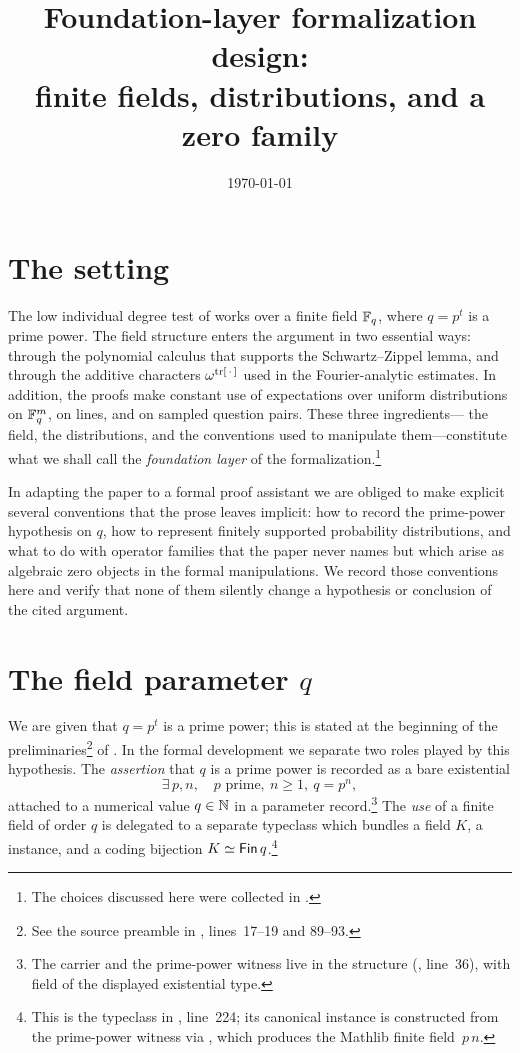 \documentclass{article}
\title{Foundation-layer formalization design:\\
finite fields, distributions, and a zero family}
\author{}
\date{\today}
\begin{document}
\maketitle

\section{The setting}

The low individual degree test of \cite{Ji2020LowIndividualDegree}
works over a finite field $\mathbb{F}_q$, where $q = p^t$ is a prime power.
The field structure enters the argument in two essential ways:
through the polynomial calculus that supports the Schwartz--Zippel
lemma, and through the additive characters $\omega^{\mathrm{tr}[\,\cdot\,]}$
used in the Fourier-analytic estimates. In addition, the proofs make
constant use of expectations over uniform distributions on $\mathbb{F}_q^m$,
on lines, and on sampled question pairs. These three ingredients---
the field, the distributions, and the conventions used to manipulate
them---constitute what we shall call the \emph{foundation layer} of
the formalization.\footnote{The choices discussed here were collected
in .}

In adapting the paper to a formal proof assistant we are obliged to
make explicit several conventions that the prose leaves implicit:
how to record the prime-power hypothesis on $q$, how to represent
finitely supported probability distributions, and what to do with
operator families that the paper never names but which arise as
algebraic zero objects in the formal manipulations. We record those
conventions here and verify that none of them silently change a
hypothesis or conclusion of the cited argument.

\section{The field parameter $q$}

We are given that $q = p^t$ is a prime power; this is stated at the
beginning of the preliminaries\footnote{See the source preamble in
, lines~17--19 and
89--93.} of \cite{Ji2020LowIndividualDegree}. In the formal
development we separate two roles played by this hypothesis. The
\emph{assertion} that $q$ is a prime power is recorded as a bare
existential
\[
  \exists\, p, n,\quad p\text{ prime},\ n \ge 1,\ q = p^n,
\]
attached to a numerical value $q \in \mathbb{N}$ in a parameter
record.\footnote{The carrier and the prime-power witness live in the
structure  (,
line~36), with field  of the displayed
existential type.}  The \emph{use} of a finite field of order $q$ is
delegated to a separate typeclass which bundles a field $K$, a
 instance, and a coding bijection $K \simeq
\textsf{Fin}\,q$.\footnote{This is the typeclass
 in , line~224;
its canonical instance is constructed from the prime-power witness
via , which produces the
Mathlib finite field \,$p$\,$n$.}
\end{document}
